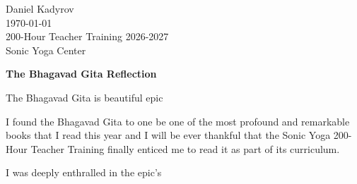 \documentclass[11pt]{article}
\begin{document}
 
\noindent
Daniel Kadyrov\\
\today\\
200-Hour Teacher Training 2026-2027\\
Sonic Yoga Center
 
\vspace{1em}
 
\begin{center}
  \textbf{The Bhagavad Gita Reflection}
\end{center}
 




The Bhagavad Gita is beautiful epic 


I found the Bhagavad Gita to one be one of the most profound and remarkable books that I read this year and I will be ever thankful that the Sonic Yoga 200-Hour Teacher Training finally enticed me to read it as part of its curriculum.

I was deeply enthralled in the epic's 
 
\end{document}

